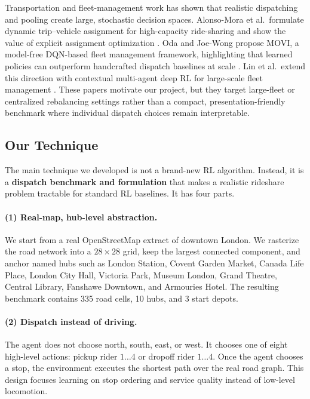 \documentclass{article}
\begin{document}
Transportation and fleet-management work has shown that realistic dispatching and pooling create large, stochastic decision spaces. Alonso-Mora et al.\ formulate dynamic trip--vehicle assignment for high-capacity ride-sharing and show the value of explicit assignment optimization \citep{alonso2017ride}. Oda and Joe-Wong propose MOVI, a model-free DQN-based fleet management framework, highlighting that learned policies can outperform handcrafted dispatch baselines at scale \citep{oda2018movi}. Lin et al.\ extend this direction with contextual multi-agent deep RL for large-scale fleet management \citep{lin2018fleet}. These papers motivate our project, but they target large-fleet or centralized rebalancing settings rather than a compact, presentation-friendly benchmark where individual dispatch choices remain interpretable.

\subsection{Our Technique}
The main technique we developed is not a brand-new RL algorithm. Instead, it is a \textbf{dispatch benchmark and formulation} that makes a realistic rideshare problem tractable for standard RL baselines. It has four parts.

\paragraph{(1) Real-map, hub-level abstraction.}
We start from a real OpenStreetMap extract of downtown London. We rasterize the road network into a \(28 \times 28\) grid, keep the largest connected component, and anchor named hubs such as London Station, Covent Garden Market, Canada Life Place, London City Hall, Victoria Park, Museum London, Grand Theatre, Central Library, Fanshawe Downtown, and Armouries Hotel. The resulting benchmark contains 335 road cells, 10 hubs, and 3 start depots.

\paragraph{(2) Dispatch instead of driving.}
The agent does not choose north, south, east, or west. It chooses one of eight high-level actions: pickup rider \(1\ldots4\) or dropoff rider \(1\ldots4\). Once the agent chooses a stop, the environment executes the shortest path over the real road graph. This design focuses learning on stop ordering and service quality instead of low-level locomotion.
\end{document}
